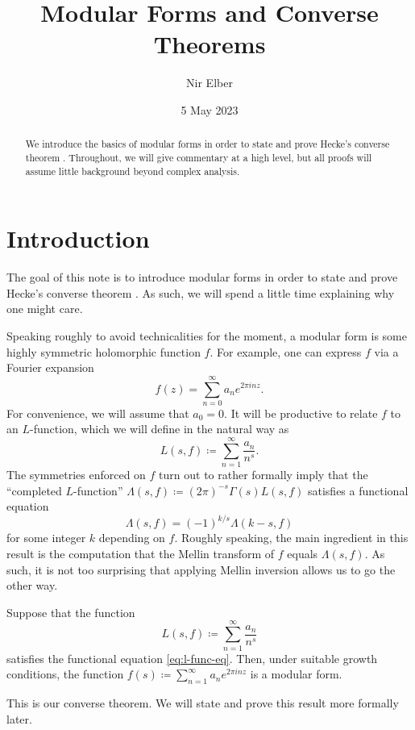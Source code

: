 \documentclass{amsart}
\title{Modular Forms and Converse Theorems}
\author{Nir Elber}
\date{5 May 2023}
\begin{document}
\begin{abstract}
	\noindent We introduce the basics of modular forms in order to state and prove Hecke's converse theorem \cite{hecke-converse}. Throughout, we will give commentary at a high level, but all proofs will assume little background beyond complex analysis.
\end{abstract}

\maketitle

\setcounter{tocdepth}{2}
\tableofcontents

\section{Introduction}
The goal of this note is to introduce modular forms in order to state and prove Hecke's converse theorem \cite{hecke-converse}. As such, we will spend a little time explaining why one might care.

Speaking roughly to avoid technicalities for the moment, a modular form is some highly symmetric holomorphic function $f$. For example, one can express $f$ via a Fourier expansion
\[f(z)=\sum_{n=0}^\infty a_ne^{2\pi inz}.\]
For convenience, we will assume that $a_0=0$. It will be productive to relate $f$ to an $L$-function, which we will define in the natural way as
\[L(s,f)\coloneqq\sum_{n=1}^\infty\frac{a_n}{n^s}.\]
The symmetries enforced on $f$ turn out to rather formally imply that the ``completed $L$-function'' $\Lambda(s,f)\coloneqq(2\pi)^{-s}\Gamma(s)L(s,f)$ satisfies a functional equation
\begin{equation}
	\Lambda(s,f)=(-1)^{k/s}\Lambda(k-s,f) \label{eq:l-func-eq}
\end{equation}
for some integer $k$ depending on $f$. Roughly speaking, the main ingredient in this result is the computation that the Mellin transform of $f$ equals $\Lambda(s,f)$. As such, it is not too surprising that applying Mellin inversion allows us to go the other way.
\begin{theorem}[Hecke]
	Suppose that the function
	\[L(s,f)\coloneqq\sum_{n=1}^\infty\frac{a_n}{n^s}\]
	satisfies the functional equation \eqref{eq:l-func-eq}. Then, under suitable growth conditions, the function $f(s)\coloneqq\sum_{n=1}^\infty a_ne^{2\pi inz}$ is a modular form.
\end{theorem}
This is our converse theorem. We will state and prove this result more formally later.\todo{}
\end{document}
